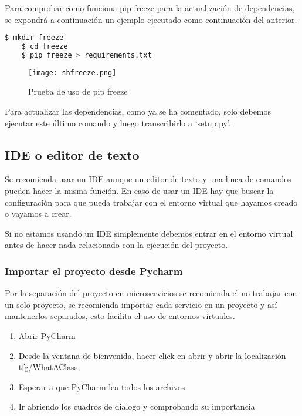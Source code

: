 Para comprobar como funciona pip freeze para la actualización de dependencias, se expondrá a continuación un ejemplo ejecutado como continuación del anterior.

\begin{lstlisting}[language=bash]
    $ mkdir freeze
    $ cd freeze
    $ pip freeze > requirements.txt
\end{lstlisting}

\begin{figure}
	\centering
	\texttt{[image: shfreeze.png]}
	\caption{Prueba de uso de pip freeze}\label{fig:shfreeze.png}
\end{figure}


Para actualizar las dependencias, como ya se ha comentado, solo debemos ejecutar este último comando y luego transcribirlo a `setup.py'.


\subsection{IDE o editor de texto}

Se recomienda usar un IDE aunque un editor de texto y una linea de comandos pueden hacer la misma función. En caso de usar un IDE hay que buscar la configuración para que pueda trabajar con el entorno virtual que hayamos creado o vayamos a crear.

Si no estamos usando un IDE simplemente debemos entrar en el entorno virtual antes de hacer nada relacionado con la ejecución del proyecto.


\subsubsection{Importar el proyecto desde Pycharm}

Por la separación del proyecto en microservicios se recomienda el no trabajar con un solo proyecto, se recomienda importar cada servicio en un proyecto y así mantenerlos separados, esto facilita el uso de entornos virtuales.


\begin{enumerate}
\setlength{\itemsep}{1pt}
\setlength{\parskip}{0pt}
\setlength{\parsep}{0pt}
\item Abrir PyCharm
\item Desde la ventana de bienvenida, hacer click en abrir y abrir la localización tfg/WhatAClass
\item Esperar a que PyCharm lea todos los archivos
\item Ir abriendo los cuadros de dialogo y comprobando su importancia
\end{enumerate}

